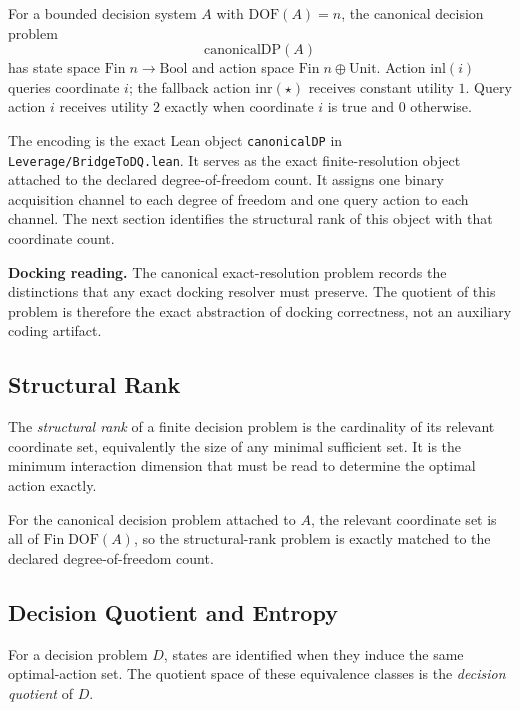 \begin{definition}\label{def:canonical-dp}
For a bounded decision system $A$ with $\mathrm{DOF}(A)=n$, the canonical decision problem
\[
\mathrm{canonicalDP}(A)
\]
has state space $\mathrm{Fin}\;n \to \mathrm{Bool}$ and action space $\mathrm{Fin}\;n \oplus \mathrm{Unit}$. Action $\mathrm{inl}(i)$ queries coordinate $i$; the fallback action $\mathrm{inr}(\star)$ receives constant utility $1$. Query action $i$ receives utility $2$ exactly when coordinate $i$ is true and $0$ otherwise.
\end{definition}

The encoding is the exact Lean object \texttt{canonicalDP} in \texttt{Leverage/BridgeToDQ.lean}. It serves as the exact finite-resolution object attached to the declared degree-of-freedom count. It assigns one binary acquisition channel to each degree of freedom and one query action to each channel. The next section identifies the structural rank of this object with that coordinate count.

\textbf{Docking reading.} The canonical exact-resolution problem records the distinctions that any exact docking resolver must preserve. The quotient of this problem is therefore the exact abstraction of docking correctness, not an auxiliary coding artifact.

\subsection{Structural Rank}

\begin{definition}\label{def:srank}
The \emph{structural rank} of a finite decision problem is the cardinality of its relevant coordinate set, equivalently the size of any minimal sufficient set. It is the minimum interaction dimension that must be read to determine the optimal action exactly.
\end{definition}

For the canonical decision problem attached to $A$, the relevant coordinate set is all of $\mathrm{Fin}\;\mathrm{DOF}(A)$, so the structural-rank problem is exactly matched to the declared degree-of-freedom count.

\subsection{Decision Quotient and Entropy}

\begin{definition}\label{def:decision-quotient}
For a decision problem $D$, states are identified when they induce the same optimal-action set. The quotient space of these equivalence classes is the \emph{decision quotient} of $D$.
\end{definition}

